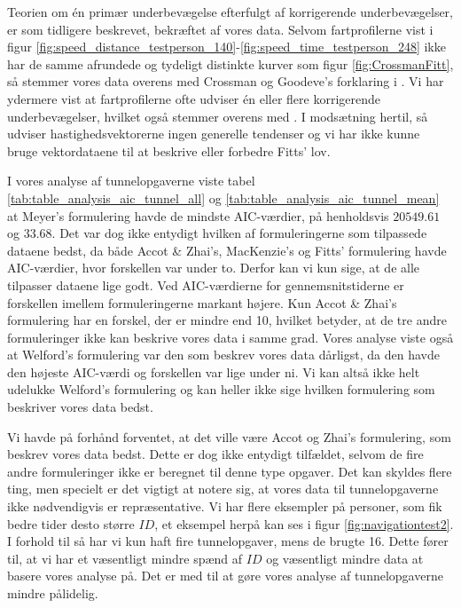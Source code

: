 Teorien om én primær underbevægelse efterfulgt af korrigerende underbevægelser, er som tidligere beskrevet, bekræftet af vores data. Selvom fartprofilerne vist i figur \ref{fig:speed_distance_testperson_140}-\ref{fig:speed_time_testperson_248} ikke har de samme afrundede og tydeligt distinkte kurver som figur \ref{fig:CrossmanFitt}, så stemmer vores data overens med Crossman og Goodeve's forklaring i \cite{crossman1983}. Vi har ydermere vist at fartprofilerne ofte udviser én eller flere korrigerende underbevægelser, hvilket også stemmer overens med \cite{crossman1983}. I modsætning hertil, så udviser hastighedsvektorerne ingen generelle tendenser og vi har ikke kunne bruge vektordataene til at beskrive eller forbedre Fitts' lov.

I vores analyse af tunnelopgaverne viste tabel \ref{tab:table_analysis_aic_tunnel_all} og \ref{tab:table_analysis_aic_tunnel_mean} at Meyer's formulering havde de mindste AIC-værdier, på henholdsvis $20549.61$ og $33.68$. Det var dog ikke entydigt hvilken af formuleringerne som tilpassede dataene bedst, da både Accot \& Zhai's, MacKenzie's og Fitts' formulering havde AIC-værdier, hvor forskellen var under to. Derfor kan vi kun sige, at de alle tilpasser dataene lige godt. Ved AIC-værdierne for gennemsnitstiderne er forskellen imellem formuleringerne markant højere. Kun Accot \& Zhai's formulering har en forskel, der er mindre end 10, hvilket betyder, at de tre andre formuleringer ikke kan beskrive vores data i samme grad. Vores analyse viste også at Welford's formulering var den som beskrev vores data dårligst, da den havde den højeste AIC-værdi og forskellen var lige under ni. Vi kan altså ikke helt udelukke Welford's formulering og kan heller ikke sige hvilken formulering som beskriver vores data bedst.

Vi havde på forhånd forventet, at det ville være Accot og Zhai's formulering, som beskrev vores data bedst. Dette er dog ikke entydigt tilfældet, selvom de fire andre formuleringer ikke er beregnet til denne type opgaver. Det kan skyldes flere ting, men specielt er det vigtigt at notere sig, at vores data til tunnelopgaverne ikke nødvendigvis er repræsentative. Vi har flere eksempler på personer, som fik bedre tider desto større $ID$, et eksempel herpå kan ses i figur \ref{fig:navigationtest2}. I forhold til \cite{accot1997} så har vi kun haft fire tunnelopgaver, mens de brugte 16. Dette fører til, at vi har et væsentligt mindre spænd af $ID$ og væsentligt mindre data at basere vores analyse på. Det er med til at gøre vores analyse af tunnelopgaverne mindre pålidelig.

